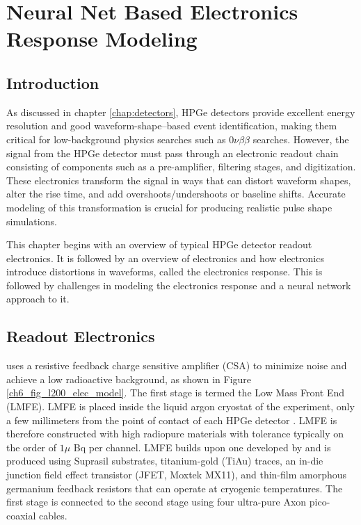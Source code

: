 \chapter{Neural Net Based Electronics Response Modeling}
\label{chap:elect_resp}

\section{Introduction}
As discussed in chapter \ref{chap:detectors}, HPGe detectors provide excellent energy resolution and good waveform-shape–based event identification, making them critical for low-background physics searches such as $0\nu\beta\beta$ searches. However, the signal from the HPGe detector must pass through an electronic readout chain consisting of components such as a pre-amplifier, filtering stages, and digitization. These electronics transform the signal in ways that can distort waveform shapes, alter the rise time, and add overshoots/undershoots or baseline shifts. Accurate modeling of this transformation is crucial for producing realistic pulse shape simulations.

This chapter begins with an overview of typical HPGe detector readout electronics. It is followed by an overview of {\Ltwo}  electronics and how electronics introduce distortions in waveforms, called the electronics response. This is followed by challenges in modeling the electronics response and a neural network approach to it.

\section{{\Ltwo} Readout Electronics}

{\Ltwo} uses a resistive feedback charge sensitive amplifier (CSA) to minimize noise and achieve a low radioactive background, as shown in Figure \ref{ch6_fig_l200_elec_model}. The first stage is termed the Low Mass Front End (LMFE). LMFE is placed inside the liquid argon cryostat of the experiment, only a few millimeters from the point of contact of each HPGe detector \cite{Willers_2020}. LMFE is therefore constructed with high radiopure materials with tolerance typically on the order of $1\mu$ Bq per channel. LMFE builds upon one developed by {\MJD} and is produced using Suprasil substrates, titanium-gold (TiAu) traces, an in-die junction field effect transistor (JFET, Moxtek MX11), and thin-film amorphous germanium feedback resistors that can operate at cryogenic temperatures. The first stage is connected to the second stage using four ultra-pure Axon pico-coaxial cables.

